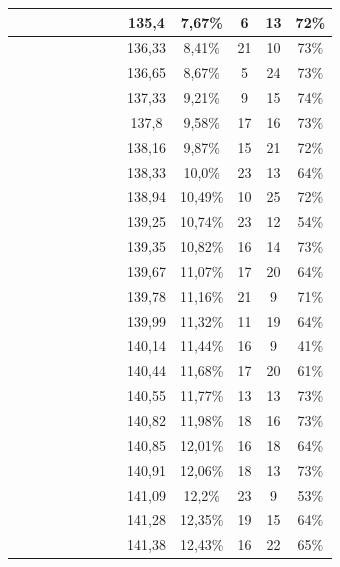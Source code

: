 \begin{center}
\begin{longtable}{|c|c|c|c|c|c|c|c|c|c|c|c|c|}
 \x &  \x &  \x &  &  \x &  \x &  &  \x & 135,4 & 7,67\% & 6 & 13 & 72\% \\ \hline
 \x &  \x &  \x &  &  &  \x &  &  \x & 136,33 & 8,41\% & 21 & 10 & 73\% \\ \hline
 \x &  \x &  &  &  &  \x &  \x &  \x & 136,65 & 8,67\% & 5 & 24 & 73\% \\ \hline
 \x &  &  &  &  &  \x &  &  \x & 137,33 & 9,21\% & 9 & 15 & 74\% \\ \hline
 \x &  &  &  \x &  \x &  \x &  &  \x & 137,8 & 9,58\% & 17 & 16 & 73\% \\ \hline
 \x &  \x &  &  &  \x &  \x &  &  \x & 138,16 & 9,87\% & 15 & 21 & 72\% \\ \hline
 \x &  &  \x &  &  &  &  &  \x & 138,33 & 10,0\% & 23 & 13 & 64\% \\ \hline
 \x &  \x &  &  \x &  &  \x &  &  \x & 138,94 & 10,49\% & 10 & 25 & 72\% \\ \hline
 \x &  \x &  &  &  &  &  &  \x & 139,25 & 10,74\% & 23 & 12 & 54\% \\ \hline
 \x &  \x &  &  &  &  \x &  &  \x & 139,35 & 10,82\% & 16 & 14 & 73\% \\ \hline
 \x &  \x &  \x &  &  &  &  &  \x & 139,67 & 11,07\% & 17 & 20 & 64\% \\ \hline
 \x &  &  \x &  &  \x &  \x &  &  \x & 139,78 & 11,16\% & 21 & 9 & 71\% \\ \hline
 \x &  \x &  \x &  \x &  &  &  &  \x & 139,99 & 11,32\% & 11 & 19 & 64\% \\ \hline
 \x &  &  &  &  &  &  &  \x & 140,14 & 11,44\% & 16 & 9 & 41\% \\ \hline
 \x &  &  &  &  \x &  &  &  \x & 140,44 & 11,68\% & 17 & 20 & 61\% \\ \hline
 \x &  &  &  \x &  &  \x &  &  \x & 140,55 & 11,77\% & 13 & 13 & 73\% \\ \hline
 \x &  &  \x &  &  &  \x &  &  \x & 140,82 & 11,98\% & 18 & 16 & 73\% \\ \hline
 \x &  \x &  \x &  &  &  &  &  \x & 140,85 & 12,01\% & 16 & 18 & 64\% \\ \hline
 \x &  \x &  \x &  \x &  &  \x &  &  \x & 140,91 & 12,06\% & 18 & 13 & 73\% \\ \hline
 \x &  \x &  &  &  &  &  &  \x & 141,09 & 12,2\% & 23 & 9 & 53\% \\ \hline
 \x &  &  \x &  &  &  &  &  \x & 141,28 & 12,35\% & 19 & 15 & 64\% \\ \hline
 \x &  &  \x &  &  \x &  &  &  \x & 141,38 & 12,43\% & 16 & 22 & 65\% \\ \hline

\end{longtable}
\end{center}
